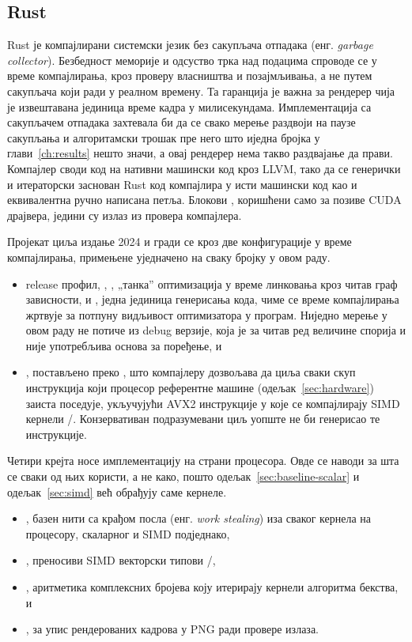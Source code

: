 \documentclass[serbian]{ftndiplomski}
\begin{document}
\subsection{Rust}
\label{sec:rust}

Rust је компајлирани системски језик без сакупљача отпадака (енг. \emph{garbage
collector}). Безбедност меморије и одсуство трка над подацима спроводе се у време
компајлирања, кроз проверу власништва и позајмљивања, а не путем сакупљача који ради
у реалном времену. Та гаранција је важна за рендерер чија је извештавана јединица
време кадра у милисекундама. Имплементација са сакупљачем отпадака захтевала би да се
свако мерење раздвоји на паузе сакупљања и алгоритамски трошак пре него што иједна
бројка у глави~\ref{ch:results} нешто значи, а овај рендерер нема такво раздвајање да
прави. Компајлер своди код на нативни машински код кроз LLVM, тако да се генерички и
итераторски заснован Rust код компајлира у исти машински код као и еквивалентна ручно
написана петља. Блокови , коришћени само за позиве CUDA драјвера, једини
су излаз из провера компајлера.

Пројекат циља издање 2024 и гради се кроз две конфигурације у време компајлирања,
примењене уједначено на сваку бројку у овом раду.
\begin{itemize}
  \item release профил, , , „танка''
  оптимизација у време линковања кроз читав граф зависности, и
  , једна јединица генерисања кода, чиме се време
  компајлирања жртвује за потпуну видљивост оптимизатора у програм. Ниједно мерење у
  овом раду не потиче из debug верзије, која је за читав ред величине спорија и није
  употребљива основа за поређење, и
  \item {}, постављено преко , што компајлеру
  дозвољава да циља сваки скуп инструкција који процесор референтне машине
  (одељак~\ref{sec:hardware}) заиста поседује, укључујући AVX2 инструкције у које се
  компајлирају SIMD кернели /. Конзервативан подразумевани циљ
  уопште не би генерисао те инструкције.
\end{itemize}

Четири крејта носе имплементацију на страни процесора. Овде се наводи за шта се сваки
од њих користи, а не како, пошто одељак~\ref{sec:baseline-scalar} и
одељак~\ref{sec:simd} већ обрађују саме кернеле.
\begin{itemize}
  \item {}, базен нити са крађом посла (енг. \emph{work stealing}) иза сваког
  кернела на процесору, скаларног и SIMD подједнако,
  \item {}, преносиви SIMD векторски типови /,
  \item {}, аритметика комплексних бројева коју итерирају кернели
  алгоритма бекства, и
  \item {}, за упис рендерованих кадрова у PNG ради провере излаза.
\end{itemize}
\end{document}

